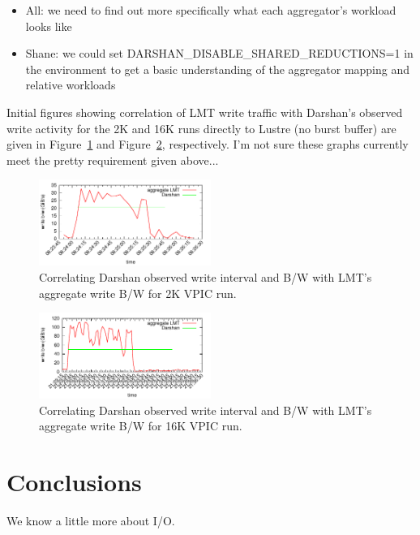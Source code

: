 \documentclass[conference,10pt,compsocconf]{IEEEtran}
\begin{document}
\begin{itemize}
\begin{itemize}
\begin{itemize}
            \begin{itemize}
            \item All: we need to find out more specifically what each aggregator's workload looks like
            \item Shane: we could set DARSHAN\_DISABLE\_SHARED\_REDUCTIONS=1 in the environment to
                  get a basic understanding of the aggregator mapping and relative workloads
            \end{itemize}
        \end{itemize}
    \end{itemize}
\end{itemize}

Initial figures showing correlation of LMT write traffic with Darshan's observed
write activity for the 2K and 16K runs directly to Lustre (no burst buffer) are
given in Figure~\ref{fig:2k-write} and Figure~\ref{fig:16k-write}, respectively.
I'm not sure these graphs currently meet the pretty requirement given above...

\begin{figure}
\centering
\includegraphics[width=0.5\textwidth]{figs/2k-lustre-wr-bw.pdf}
\caption{Correlating Darshan observed write interval and B/W with LMT's aggregate
write B/W for 2K VPIC run.}
\label{fig:2k-write}
\end{figure}

\begin{figure}
\centering
\includegraphics[width=0.5\textwidth]{figs/16k-lustre-wr-bw.pdf}
\caption{Correlating Darshan observed write interval and B/W with LMT's aggregate
write B/W for 16K VPIC run.}
\label{fig:16k-write}
\end{figure}

\section{Conclusions}

We know a little more about I/O.



\end{document}
